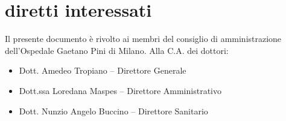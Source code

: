 %
%
\section[Diretti interessati]{diretti interessati}
\label{abs-recipient}
Il presente documento è rivolto ai membri del consiglio di amministrazione dell'Ospedale Gaetano Pini di Milano. Alla C.A. dei dottori:

\begin{itemize}
\item{Dott. Amedeo Tropiano -- Direttore Generale}
\item{Dott.ssa Loredana Maspes -- Direttore Amministrativo}
\item{Dott. Nunzio Angelo Buccino -- Direttore Sanitario}
\end{itemize}